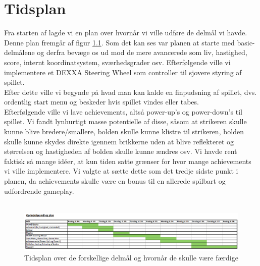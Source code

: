 \chapter{Tidsplan}
Fra starten af lagde vi en plan over hvornår vi ville udføre de delmål vi havde. Denne plan fremgår af figur \ref{fig:tidsplan1}. Som det kan ses var planen at starte med basic-delmålene og derfra bevæge os ud mod de mere avancerede som liv, hastighed, score, internt koordinatsystem, sværhedsgrader osv. Efterfølgende ville vi implementere et DEXXA Steering Wheel som controller til sjovere styring af spillet.\\
Efter dette ville vi begynde på hvad man kan kalde en finpudsning af spillet, dvs. ordentlig start menu og beskeder hvis spillet vindes eller tabes. \\

Efterfølgende ville vi lave achievements, altså power-up's og power-down's til spillet. Vi fandt lynhurtigt masse potentielle af disse, såsom at strikeren skulle kunne blive bredere/smallere, bolden skulle kunne klistre til strikeren, bolden skulle kunne skydes direkte igennem brikkerne uden at blive reflekteret og størrelsen og hastigheden af bolden skulle kunne ændres osv. Vi havde rent faktisk så mange idéer, at kun tiden satte grænser for hvor mange achievements vi ville implementere. Vi valgte at sætte dette som det tredje sidste punkt i planen, da achievements skulle være en bonus til en allerede spilbart og udfordrende gameplay.\\ \\


\begin{figure}[h!]
\centering
\includegraphics[width=\textwidth]{figs/Tidsplan1.png}
\caption{Tidsplan over de forskellige delmål og hvornår de skulle være færdige}
\label{fig:tidsplan1}
\end{figure}
